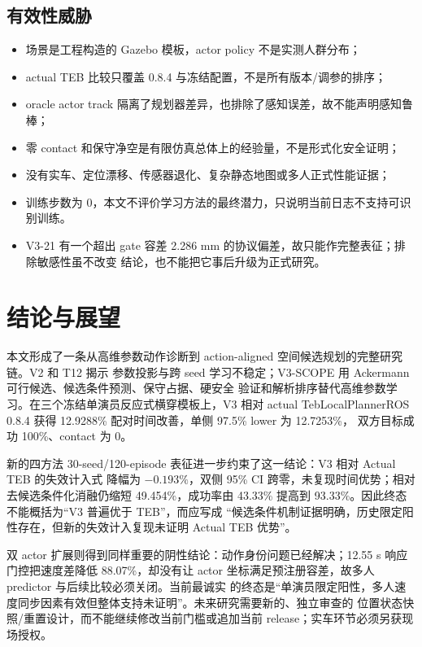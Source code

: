 \documentclass[12pt,a4paper,oneside]{report}
\begin{document}
\section{有效性威胁}
\begin{itemize}
  \item 场景是工程构造的 Gazebo 模板，actor policy 不是实测人群分布；
  \item actual TEB 比较只覆盖 0.8.4 与冻结配置，不是所有版本/调参的排序；
  \item oracle actor track 隔离了规划器差异，也排除了感知误差，故不能声明感知鲁棒；
  \item 零 contact 和保守净空是有限仿真总体上的经验量，不是形式化安全证明；
  \item 没有实车、定位漂移、传感器退化、复杂静态地图或多人正式性能证据；
  \item 训练步数为 0，本文不评价学习方法的最终潜力，只说明当前日志不支持可识别训练。
  \item V3-21 有一个超出 gate 容差 2.286 mm 的协议偏差，故只能作完整表征；排除敏感性虽不改变
  结论，也不能把它事后升级为正式研究。
\end{itemize}

\chapter{结论与展望}
本文形成了一条从高维参数动作诊断到 action-aligned 空间候选规划的完整研究链。V2 和 T12 揭示
参数投影与跨 seed 学习不稳定；V3-SCOPE 用 Ackermann 可行候选、候选条件预测、保守占据、硬安全
验证和解析排序替代高维参数学习。在三个冻结单演员反应式横穿模板上，V3 相对 actual
TebLocalPlannerROS 0.8.4 获得 12.9288\% 配对时间改善，单侧 97.5\% lower 为 12.7253\%，
双方目标成功 100\%、contact 为 0。

新的四方法 30-seed/120-episode 表征进一步约束了这一结论：V3 相对 Actual TEB 的失效计入式
降幅为 $-0.193\%$，双侧 95\% CI 跨零，未复现时间优势；相对去候选条件化消融仍缩短
49.454\%，成功率由 43.33\% 提高到 93.33\%。因此终态不能概括为“V3 普遍优于 TEB”，而应写成
“候选条件机制证据明确，历史限定阳性存在，但新的失效计入复现未证明 Actual TEB 优势”。

双 actor 扩展则得到同样重要的阴性结论：动作身份问题已经解决；12.55 s 响应门控把速度差降低
88.07\%，却没有让 actor 坐标满足预注册容差，故多人 predictor 与后续比较必须关闭。当前最诚实
的终态是“单演员限定阳性，多人速度同步因素有效但整体支持未证明”。未来研究需要新的、独立审查的
位置状态快照/重置设计，而不能继续修改当前门槛或追加当前 release；实车环节必须另获现场授权。
\end{document}
